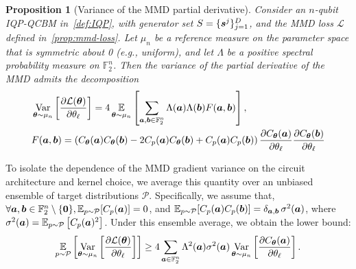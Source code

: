\documentclass{article}
\theoremstyle{plain}
\newtheorem{proposition}[theorem]{Proposition}
\theoremstyle{definition}
\theoremstyle{remark}
\begin{document}
\begin{proposition}[Variance of the MMD partial derivative]
\label{prop:lower}
Consider an $n$-qubit IQP-QCBM in~\cref{def:IQP}, with generator set $S=\{{\bm{s}^j}\}_{j=1}^D$, and the MMD loss $\mathcal{L}$ defined in~\cref{prop:mmd-loss}. Let $\mu_n$ be a reference measure on the parameter space that is symmetric about 0 (e.g., uniform), and let $\Lambda$ be a positive spectral probability measure on $\mathbb{F}_2^n$. Then the variance of the partial derivative of the MMD admits the decomposition
\begin{align}
&\operatorname*{Var}_{{\bm{\theta}}\sim \mu_n} \left[ \frac{\partial \mathcal{L}({\bm{\theta}})}{\partial \theta_\ell} \right]
= 4 \operatorname*{\mathbb{E}}_{{\bm{\theta}}\sim \mu_n} \left[ \sum_{{\bm{a}}, {\bm{b}} \in \mathbb{F}_2^n} \Lambda({\bm{a}}) \Lambda({\bm{b}})F({\bm{a}}, {\bm{b}})\right], \label{eq:decomposition} \\
&F({\bm{a}}, {\bm{b}}) = \left( C_{\bm{\theta}}({\bm{a}}) C_{\bm{\theta}}({\bm{b}}) - 2C_p({\bm{a}}) C_{\bm{\theta}}({\bm{b}}) + C_p({\bm{a}}) C_p({\bm{b}}) \right)\frac{\partial C_{\bm{\theta}}({\bm{a}})}{\partial \theta_\ell} \frac{\partial C_{\bm{\theta}}({\bm{b}})}{\partial \theta_\ell} \nonumber
\end{align}
\end{proposition}
To isolate the dependence of the MMD gradient variance on the circuit architecture and kernel choice, we average this quantity over an unbiased ensemble of target distributions $\mathcal P$. Specifically, we assume that, $\forall{\bm{a}}, {\bm{b}} \in \mathbb{F}_2^n \setminus \{\bm{0}\},\operatorname*{\mathbb {E}}_{p\sim\mathcal {P}}[C_p({\bm{a}})]=0$, and $\operatorname*{\mathbb {E}}_{p\sim\mathcal {P}}\!\left[C_p({\bm{a}})C_p({\bm{b}})\right]=\delta_{{\bm{a}},{\bm{b}}}\,\sigma^2({\bm{a}})$, where $\sigma^2({\bm{a}}) = \operatorname*{\mathbb {E}}_{p \sim \mathcal{P}}\left[C_p({\bm{a}})^2\right]$. Under this ensemble average, we obtain the lower bound:
\begin{equation}
\operatorname*{\mathbb{E}}_{p\sim\mathcal{P}} \left[\operatorname*{Var}_{{\bm{\theta}}\sim\mu_n}  
\left[\frac{\partial \mathcal{L}({\bm{\theta}})}{\partial \theta_\ell} \right]\right] \geq
4 \sum_{{\bm{a}}\in \mathbb{F}_2^n} \Lambda^2({\bm{a}})\sigma^2({\bm{a}})\operatorname*{Var}_{{\bm{\theta}}\sim\mu_n} \left[ \frac{\partial C_{\bm{\theta}}({\bm{a}})}{\partial \theta_\ell} \right].
\label{eq:lower-bound}
\end{equation}
\end{document}
